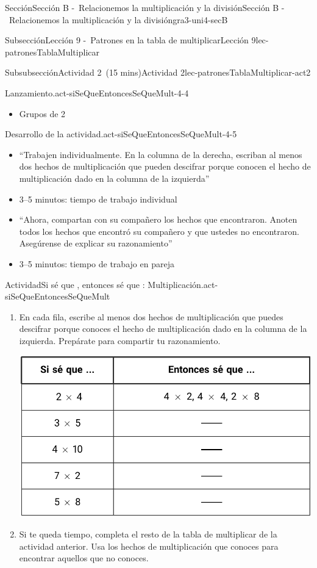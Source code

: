 \documentclass[oneside,10pt,]{article}
\begin{document}
\begin{sectionptx}{Sección}{Sección B -~Relacionemos la multiplicación y la división}{}{Sección B -~Relacionemos la multiplicación y la división}{}{}{gra3-uni4-secB}
\begin{subsectionptx}{Subsección}{Lección 9 -~Patrones en la tabla de multiplicar}{}{Lección 9}{}{}{lec-patronesTablaMultiplicar}
\begin{subsubsectionptx}{Subsubsección}{Actividad 2~(15 mins)}{}{Actividad 2}{}{}{lec-patronesTablaMultiplicar-act2}
\begin{paragraphs}{Lanzamiento.}{act-siSeQueEntoncesSeQueMult-4-4}
\begin{itemize}[label=\textbullet]
\item{}Grupos de 2%
\end{itemize}
\end{paragraphs}%
\begin{paragraphs}{Desarrollo de la actividad.}{act-siSeQueEntoncesSeQueMult-4-5}%
%
\begin{itemize}[label=\textbullet]
\item{}``Trabajen individualmente. En la columna de la derecha, escriban al menos dos hechos de multiplicación que pueden descifrar porque conocen el hecho de multiplicación dado en la columna de la izquierda''%
\item{}3–5 minutos: tiempo de trabajo individual%
\item{}``Ahora, compartan con su compañero los hechos que encontraron. Anoten todos los hechos que encontró su compañero y que ustedes no encontraron. Asegúrense de explicar su razonamiento''%
\item{}3–5 minutos: tiempo de trabajo en pareja%
\end{itemize}
\end{paragraphs}%
\begin{activity}{Actividad}{Si sé que \textellipsis{}, entonces sé que \textellipsis{}: Multiplicación.}{act-siSeQueEntoncesSeQueMult}%
%
\begin{enumerate}
\item{}En cada fila, escribe al menos dos hechos de multiplicación que puedes descifrar porque conoces el hecho de multiplicación dado en la columna de la izquierda. Prepárate para compartir tu razonamiento.%
\begin{image}{0}{1}{0}{}%
\includegraphics[width=\linewidth]{external/tikz-source/siSeQueEntoncesSeQueMult-tab.pdf}
\end{image}%
\item{}Si te queda tiempo, completa el resto de la tabla de multiplicar de la actividad anterior. Usa los hechos de multiplicación que conoces para encontrar aquellos que no conoces.%

\end{enumerate}
\end{activity}
\end{subsubsectionptx}
\end{subsectionptx}
\end{sectionptx}
\end{document}
